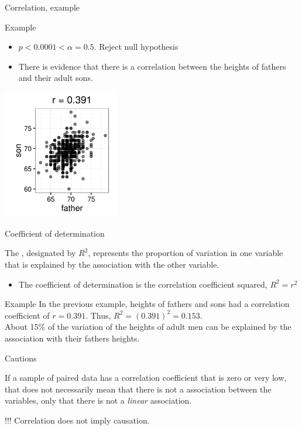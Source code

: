\documentclass[xcolor=table]{beamer}
\begin{document}
\begin{frame}{Correlation, example}
\begin{exampleblock}{Example}
\begin{itemize}
\item $p < 0.0001 < \alpha = 0.5$. Reject null hypothesis
\item There is evidence that there is a correlation between the heights of fathers and their adult sons.
\end{itemize} 
\end{exampleblock}
\medskip
{\centering
\includegraphics[width=2in]{../images/ch10_cor_galton}
\par}
\end{frame}

\begin{frame}{Coefficient of determination}
\begin{block}{}
\large
The , designated by $R^2$, represents the proportion of variation in one variable that is explained by the association with the other variable.
\begin{itemize}
\item The coefficient of determination is the correlation coefficient squared,  $R^2 = r^2$
\end{itemize}
\end{block}

\pause
\begin{exampleblock}{Example}
In the previous example, heights of fathers and sons had a correlation coefficient of $r=0.391$. Thus, $R^2 = (0.391)^2 = 0.153$.\\
\medskip
About 15\% of the variation of the heights of adult men can be explained by the association with their fathers heights.
\end{exampleblock}
\end{frame}

\begin{frame}{Cautions}
\begin{block}{}
\large
If a sample of paired data has a correlation coefficient that is zero or very low, that does not necessarily mean that there is not a association between the variables, only that there is not a \emph{linear} association. 
\end{block}

\pause
\begin{alertblock}{!!!}
\Large
Correlation does not imply causation.
\end{alertblock}
\end{frame}
\end{document}
